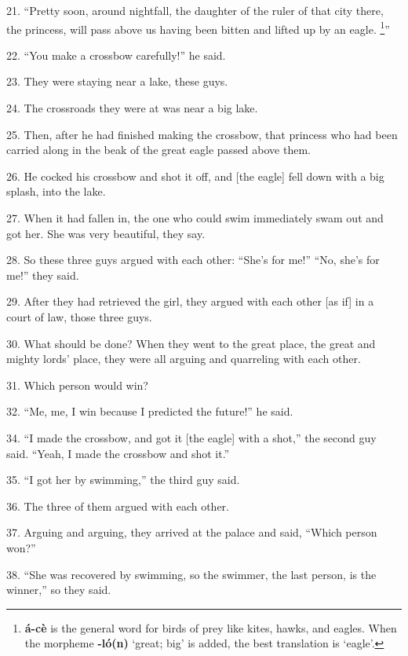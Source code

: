 21. ``Pretty soon, around nightfall, the daughter of the ruler of that city there,
the princess, will pass above us having been bitten and lifted up by an eagle.
\footnote{\textbf{á-cè} is the general word for birds of prey like kites, hawks, and eagles. When the morpheme \textbf{-ló(n)} `great; big' is added, the best translation is `eagle'.}''

22. ``You make a crossbow carefully!'' he said.

23. They were staying near a lake, these guys.

24. The crossroads they were at was near a big lake.

25. Then, after he had finished making the crossbow, that princess who had been
carried along in the beak of the great eagle passed above them.

26. He cocked his crossbow and shot it off, and [the eagle] fell down with a big
splash, into the lake.

27. When it had fallen in, the one who could swim immediately swam out and got
her. She was very beautiful, they say.

28. So these three guys argued with each other: ``She's for me!'' ``No, she's for
me!'' they said.

29. After they had retrieved the girl, they argued with each other [as if] in a
court of law, those three guys.

30. What should be done? When they went to the great place, the great and mighty
lords' place, they were all arguing and quarreling with each other.

31. Which person would win?

32. ``Me, me, I win because I predicted the future!'' he said.

34. ``I made the crossbow, and got it [the eagle] with a shot,'' the second guy
said. ``Yeah, I made the crossbow and shot it.''

35. ``I got her by swimming,'' the third guy said.

36. The three of them argued with each other.

37. Arguing and arguing, they arrived at the palace and said, ``Which person won?''

38. ``She was recovered by swimming, so the swimmer, the last person, is the winner,''
so they said.

